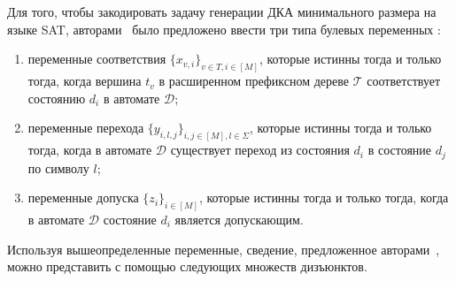 Для того, чтобы закодировать задачу генерации ДКА минимального размера на языке SAT, авторами~\cite{heule-icgi10} было предложено ввести три типа булевых переменных :
\begin{enumerate}
  \item переменные соответствия $\{x_{v,i}\}_{v \in T, i \in \left[M\right]}$, которые истинны тогда и только тогда, когда вершина $t_{v}$ в расширенном префиксном дереве $\mathcal{T}$ соответствует состоянию $d_{i}$ в автомате $\mathcal{D}$;
  \item переменные перехода $\{y_{i,l,j}\}_{i,j \in \left[M\right],l \in \Sigma}$, которые истинны тогда и только тогда, когда в автомате $\mathcal{D}$ существует переход из состояния $d_{i}$ в состояние $d_{j}$ по символу $l$;
  \item переменные допуска $\{z_{i}\}_{i \in \left[M\right]}$, которые истинны тогда и только тогда, когда в автомате $\mathcal{D}$ состояние $d_{i}$ является допускающим.
\end{enumerate}

Используя вышеопределенные переменные, сведение, предложенное авторами~\cite{heule-icgi10}, можно представить с помощью следующих множеств дизъюнктов.



